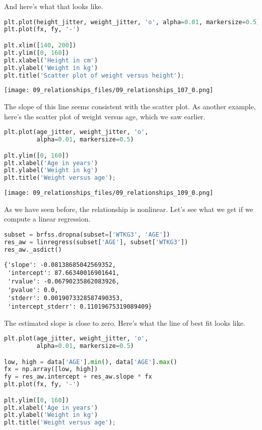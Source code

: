 And here's what that looks like.

\begin{lstlisting}[language=Python,style=source]
plt.plot(height_jitter, weight_jitter, 'o', alpha=0.01, markersize=0.5)
plt.plot(fx, fy, '-')

plt.xlim([140, 200])
plt.ylim([0, 160])
plt.xlabel('Height in cm')
plt.ylabel('Weight in kg')
plt.title('Scatter plot of weight versus height');
\end{lstlisting}

\begin{center}
\texttt{[image: 09\_relationships\_files/09\_relationships\_107\_0.png]}
\end{center}

The slope of this line seems consistent with the scatter plot. As
another example, here's the scatter plot of weight versus age, which we
saw earlier.

\begin{lstlisting}[language=Python,style=source]
plt.plot(age_jitter, weight_jitter, 'o',
         alpha=0.01, markersize=0.5)

plt.ylim([0, 160])
plt.xlabel('Age in years')
plt.ylabel('Weight in kg')
plt.title('Weight versus age');
\end{lstlisting}

\begin{center}
\texttt{[image: 09\_relationships\_files/09\_relationships\_109\_0.png]}
\end{center}

As we have seen before, the relationship is nonlinear. Let's see what we
get if we compute a linear regression.

\begin{lstlisting}[language=Python,style=source]
subset = brfss.dropna(subset=['WTKG3', 'AGE'])
res_aw = linregress(subset['AGE'], subset['WTKG3'])
res_aw._asdict()
\end{lstlisting}

\begin{lstlisting}[style=output]
{'slope': -0.08138685042569352,
 'intercept': 87.66340016901641,
 'rvalue': -0.06790235862083926,
 'pvalue': 0.0,
 'stderr': 0.0019073328587490353,
 'intercept_stderr': 0.11019675319089409}
\end{lstlisting}

The estimated slope is close to zero. Here's what the line of best fit
looks like.

\begin{lstlisting}[language=Python,style=source]
plt.plot(age_jitter, weight_jitter, 'o',
         alpha=0.01, markersize=0.5)

low, high = data['AGE'].min(), data['AGE'].max()
fx = np.array([low, high])
fy = res_aw.intercept + res_aw.slope * fx
plt.plot(fx, fy, '-')

plt.ylim([0, 160])
plt.xlabel('Age in years')
plt.ylabel('Weight in kg')
plt.title('Weight versus age');
\end{lstlisting}

